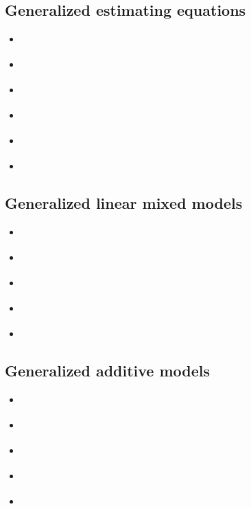 \documentclass{report}
\begin{document}
\subsection{Generalized estimating equations}

\begin{itemize}
    \item \cite[Chapter~13.5]{faraway_extending_2016}
    \item \cite[Chapter~8.7]{wakefield_bayesian_2013}
    \item \cite[Chapter~11.4]{dobson_introduction_2018}
    \item \cite[Chapter~9.6]{agresti_foundations_2015}
    \item \cite[Chapter~18.6]{hardin_generalized_2018}
    \item \cite[Chapters~3-4]{hardin_generalized_2012}
\end{itemize}

\subsection{Generalized linear mixed models}

\begin{itemize}
    \item \cite[Chapter~11.5]{dobson_introduction_2018}
    \item \cite[Chapter~13]{faraway_extending_2016}
    \item \cite[Chapter~9]{wakefield_bayesian_2013}
    \item \cite[Chapter~9]{agresti_foundations_2015}
    \item \cite[Chapter~18.4]{hardin_generalized_2018}
\end{itemize}

\subsection{Generalized additive models}

\begin{itemize}
    \item \cite[Chapter~15]{faraway_extending_2016}
    \item \cite[Chapters~4-7]{wood_generalized_2017}
    \item \cite[Chapters~4-7]{hastie_generalized_1990}
    \item \cite[Chapter~9.1]{hastie_elements_2009}
    \item \cite{rigby_generalized_2005}
\end{itemize}
\end{document}
